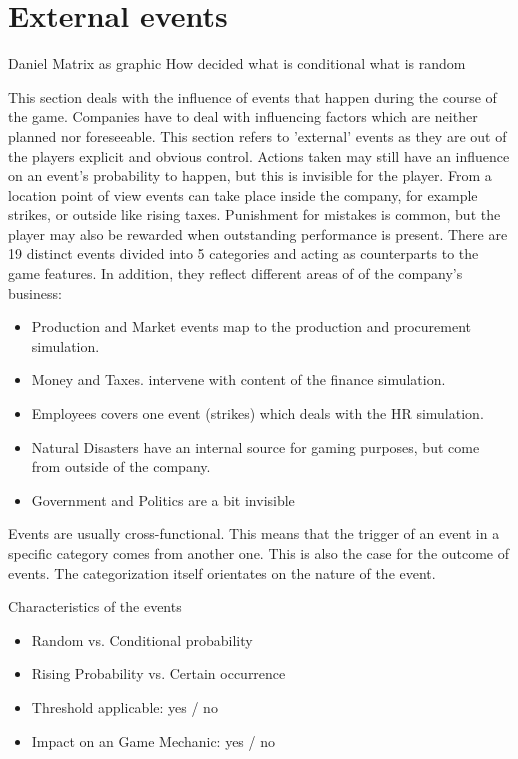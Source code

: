 \documentclass[11pt,titlepage,oneside,openany]{book}
\begin{document}
\section{External events}
Daniel
Matrix as graphic
How decided what is conditional what is random


This section deals with the influence of events that happen during the course of the game. Companies have to deal with influencing factors which are neither planned nor foreseeable.\cite{Campbell} This section refers to 'external' events as they are out of the players explicit and obvious control. Actions taken may still have an influence on an event's probability to happen, but this is invisible for the player. From a location point of view events can take place inside the company, for example strikes, or outside like rising taxes. Punishment for mistakes is common, but the player may also be rewarded when outstanding performance is present.  
There are 19 distinct events divided into 5 categories and acting as counterparts to the game features. In addition, they reflect different areas of of the company's business: 

\begin{itemize}
\item Production and Market events map to the production and procurement simulation. 
\item Money and Taxes. intervene with content of the finance simulation.  
\item Employees covers one event (strikes) which deals with the HR simulation.
\item Natural Disasters have an internal source for gaming purposes, but come from outside of the company. 
\item Government and Politics are a bit invisible 
\end{itemize}

Events are usually cross-functional. This means that the trigger of an event in a specific category comes from another one. 
This is also the case for the outcome of events. The categorization itself orientates on the nature of the event.


Characteristics of the events
\begin{itemize}
\item Random vs. Conditional probability
\item Rising Probability vs. Certain occurrence
\item Threshold applicable: yes / no
\item Impact on an Game Mechanic: yes / no
\end{itemize}
\end{document}
